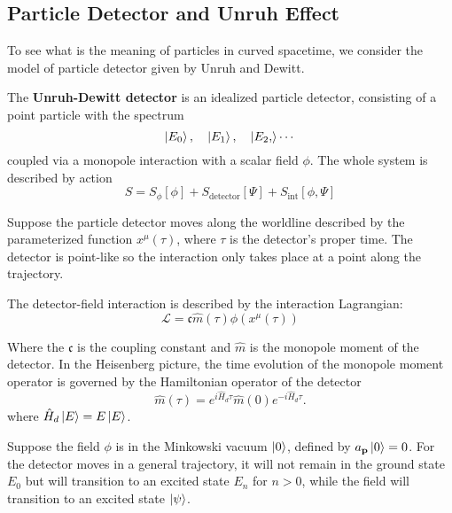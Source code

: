 \documentclass[12pt]{article}
\numberwithin{equation}{section}
\theoremstyle{1style}
\newcommand{\tbf}[1]{\textbf{#1}}
\begin{document}
\subsection{Particle Detector and Unruh Effect}
To see what is the meaning of particles in curved spacetime, we consider the model of particle detector given by Unruh and Dewitt.

The \tbf{Unruh-Dewitt detector} is an idealized particle detector,
consisting of a point particle with the spectrum
\begin{equation}
  \ket{E_0},\quad \ket{E_1},\quad \ket{E_2,} \cdots
\end{equation}
coupled via a monopole interaction with a scalar field \(\phi\).
The whole system is described by action
\begin{equation}
  S=S_{\phi}\left[\phi\right]+S_{\text{detector}}\left[\Psi\right]+S_{\text{int}}\left[\phi,\Psi\right]
\end{equation}



Suppose the particle detector moves along the worldline described by the parameterized function \(x^\mu(\tau)\),
where \(\tau\) is the detector's proper time.
The detector is point-like so the interaction only takes place at a point along the trajectory.

\par The detector-field interaction is described by the interaction Lagrangian:
\begin{equation}
  \mathcal{L}=\mathfrak{c} \hat{m}(\tau)\phi\left(x^{\mu}(\tau)\right)
\end{equation}

Where the \(\mathfrak{c}\) is the coupling constant and \(\hat{m}\) is the monopole moment of the detector.
In the Heisenberg picture, the time evolution of the monopole moment operator is governed by the Hamiltonian operator of the detector
\begin{equation}
  \hat{m}(\tau)= e^{i\hat{H}_d\tau}\hat{m}(0)e^{-i\hat{H}_d\tau}.
\end{equation}
where \(\hat{H}_d\ket{E}=E\ket{E}\).

Suppose the field \(\phi\) is in the Minkowski vacuum \(\ket{0}\), defined by \(a_{\mathbf{p}}\ket{0}=0\).
For the detector moves in a general trajectory,
it will not remain in the ground state \(E_0\) but will transition to an excited state \(E_n\) for \(n>0\),
while the field will transition to an excited state \(\ket{\psi}\).
\end{document}
